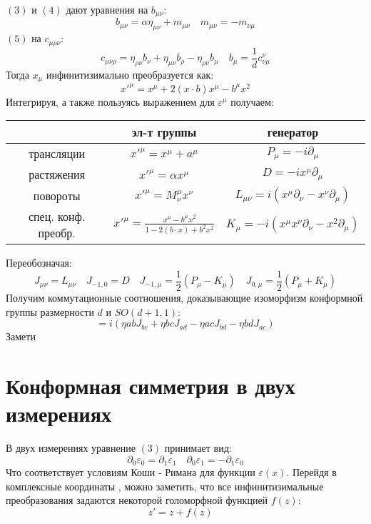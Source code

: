 \documentclass[12pt]{article}
\theoremstyle{definition}
\begin{document}
$(3)$ и $(4)$ дают уравнения на $b_{\mu\nu}$:
\begin{equation}
b_{\mu\nu} = \alpha\eta_{\mu\nu}+m_{\mu\nu} \quad m_{\mu\nu} = -m_{\nu\mu}
\end{equation}
$(5)$ на $c_{\mu\rho\nu}$:
\begin{equation}
c_{\mu\nu\rho} = \eta_{\rho\nu}b_\nu + \eta_{\mu\nu}b_\rho - \eta_{\rho\nu}b_\mu \quad b_{\mu} = \frac{1}{d}c^\nu_{\nu\mu}
\end{equation}
Тогда $x_\mu$ инфинитизимально преобразуется как:
\begin{equation}
x'^\mu = x^\mu +2(x\cdot b)x^\mu - b^\mu x^2
\end{equation}
Интегрируя, а также пользуясь выражением для $\varepsilon^\mu$ получаем:
  	\begin{center}
			\begin{tabular}{|c|c|c|}
				\hline
       & эл-т группы & генератор        \\ \hline
				трансляции & $x'^\mu = x^\mu + a^\mu$  &   $P_\mu=-i\partial_\mu$    \\ \hline
    растяжения & $x'^\mu = \alpha x^\mu$  & $D=-ix^\mu\partial_\mu$      \\ \hline
     повороты & $x'^\mu = M^\mu_\nu x^\nu$  & $L_{\mu\nu}=i(x^\mu\partial_\nu-x^\nu\partial_\mu)$      \\ \hline
     спец. конф. преобр. & $x'^\mu = \frac{x^\mu-b^\mu x^2}{1-2(b\cdot x)+b^2x^2}$  & $K_{\mu}=-i(x^\mu x^\nu\partial_\nu-x^2\partial_\mu)$      \\ \hline
			\end{tabular}
\end{center}
Переобозначая:
\begin{equation}
J_{\mu\nu} = L_{\mu\nu} \quad J_{-1,0} = D \quad J_{-1,\mu} = \frac{1}{2}(P_\mu-K_\mu)\quad J_{0,\mu} = \frac{1}{2}(P_\mu+K_\mu)
\end{equation}
Получим коммутационные соотношения, доказывающие изоморфизм конформной группы размерности $d$ и $SO(d+1,1)$:
\begin{equation}
[J_{ab},J_{cd}] = i(\eta{ab}J_{bc}+\eta{bc}J_{ad}-\eta{ac}J_{bd}-\eta{bd}J_{ac})
\end{equation}
Замети
	\section{ Конформная симметрия в двух измерениях}
В двух измерениях уравнение $(3)$ принимает вид:
\begin{equation}
\partial_0\varepsilon_0 = \partial_1\varepsilon_1 \quad \partial_0\varepsilon_1 = -\partial_1\varepsilon_0
\end{equation}
Что соответствует условиям Коши - Римана для функции $\varepsilon(x)$. Перейдя в комплексные координаты , можно заметить, что все инфинитизимальные преобразования задаются некоторой голоморфной функцией $f(z)$:
\begin{equation}
z'=z+f(z)\quad
\end{equation}
\end{document}
